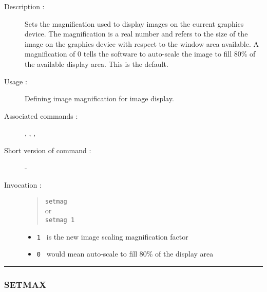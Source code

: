 \begin{description}

\item[Description :] Sets the magnification used to display images on
the current graphics device.  The magnification is a real number and
refers to the size of the image on the graphics device with respect to
the window area available.  A magnification of 0 tells the software to
auto-scale the image to fill 80\% of the available display area.  This
is the default.

\item[Usage :] Defining image magnification for image display.

\item[Associated commands :] {\tt {}},
{\tt {}}, {\tt {}},
{\tt {}}

\item[Short version of command :] -
\item[Invocation :]

\begin{quote}{\tt  setmag }\\
or \\
{\tt setmag 1 }
\end{quote}

\begin{itemize}

\item {\tt 1 } is the new image scaling magnification factor
\item {\tt 0 } would mean auto-scale to fill 80\% of the display  area
\end{itemize}

\end{description}

\hrule
\subsubsection*{\label{SETMAX}SETMAX}

